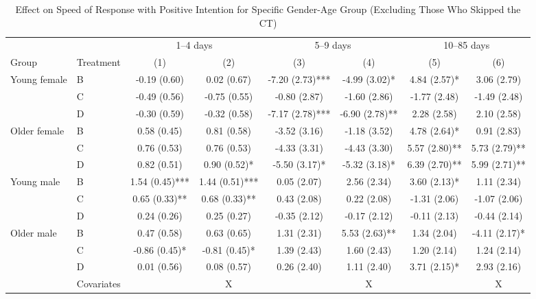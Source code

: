 \documentclass[12pt, a4paper]{article}
\begin{document}
\begin{table}[H]

\caption{\label{tab:lh-interaction-gender-age-int-time-decompose-noskip}Effect on Speed of Response with Positive Intention for Specific Gender-Age Group (Excluding Those Who Skipped the CT)}
\centering
\fontsize{8}{10}\selectfont
\begin{threeparttable}
\begin{tabular}[t]{llcccccc}
\toprule
\multicolumn{2}{c}{ } & \multicolumn{2}{c}{1--4 days} & \multicolumn{2}{c}{5--9 days} & \multicolumn{2}{c}{10--85 days} \\
\cmidrule(l{3pt}r{3pt}){3-4} \cmidrule(l{3pt}r{3pt}){5-6} \cmidrule(l{3pt}r{3pt}){7-8}
Group & Treatment & (1) & (2) & (3) & (4) & (5) & (6)\\
\midrule
Young female & B & -0.19 (0.60) & 0.02 (0.67) & -7.20 (2.73)*** & -4.99 (3.02)* & 4.84 (2.57)* & 3.06 (2.79)\\
 & C & -0.49 (0.56) & -0.75 (0.55) & -0.80 (2.87) & -1.60 (2.86) & -1.77 (2.48) & -1.49 (2.48)\\
 & D & -0.30 (0.59) & -0.32 (0.58) & -7.17 (2.78)*** & -6.90 (2.78)** & 2.28 (2.58) & 2.10 (2.58)\\
Older female & B & 0.58 (0.45) & 0.81 (0.58) & -3.52 (3.16) & -1.18 (3.52) & 4.78 (2.64)* & 0.91 (2.83)\\
 & C & 0.76 (0.53) & 0.76 (0.53) & -4.33 (3.31) & -4.43 (3.30) & 5.57 (2.80)** & 5.73 (2.79)**\\
 & D & 0.82 (0.51) & 0.90 (0.52)* & -5.50 (3.17)* & -5.32 (3.18)* & 6.39 (2.70)** & 5.99 (2.71)**\\
Young male & B & 1.54 (0.45)*** & 1.44 (0.51)*** & 0.05 (2.07) & 2.56 (2.34) & 3.60 (2.13)* & 1.11 (2.34)\\
 & C & 0.65 (0.33)** & 0.68 (0.33)** & 0.43 (2.08) & 0.22 (2.08) & -1.31 (2.06) & -1.07 (2.06)\\
 & D & 0.24 (0.26) & 0.25 (0.27) & -0.35 (2.12) & -0.17 (2.12) & -0.11 (2.13) & -0.44 (2.14)\\
Older male & B & 0.47 (0.58) & 0.63 (0.65) & 1.31 (2.31) & 5.53 (2.63)** & 1.34 (2.04) & -4.11 (2.17)*\\
 & C & -0.86 (0.45)* & -0.81 (0.45)* & 1.39 (2.43) & 1.60 (2.43) & 1.20 (2.14) & 1.24 (2.14)\\
 & D & 0.01 (0.56) & 0.08 (0.57) & 0.26 (2.40) & 1.11 (2.40) & 3.71 (2.15)* & 2.93 (2.16)\\
\midrule
 & Covariates &  & X &  & X &  & X\\
\bottomrule

\end{tabular}
\end{threeparttable}
\end{table}
\end{document}
